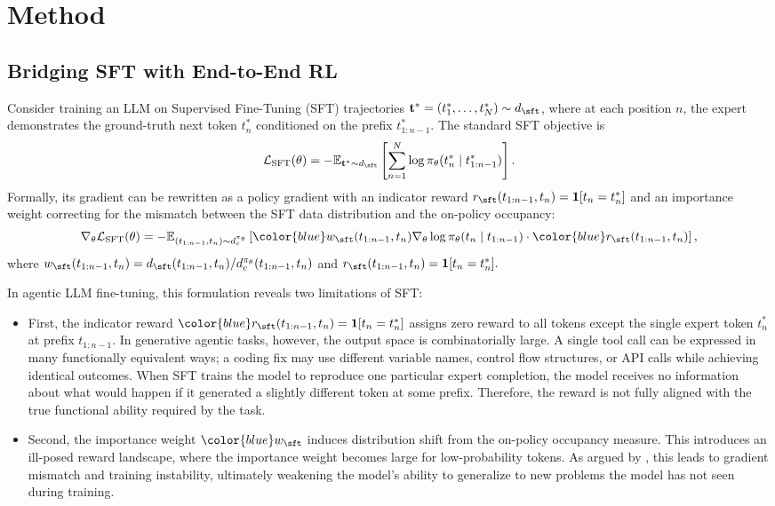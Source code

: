 \section{Method}
\label{sec:method}

\subsection{Bridging SFT with End-to-End RL}

Consider training an LLM on Supervised Fine-Tuning (SFT) trajectories $\mathbf{t}^* = (t_1^*, \dots, t_{N}^*) \sim d_{\sft}$, where at each position $n$, the expert demonstrates the ground-truth next token $t_n^*$ conditioned on the prefix $t_{1:n-1}^*$. The standard SFT objective is
\begin{align*}
\mathcal{L}_{\text{SFT}}(\theta)
= -\mathbb{E}_{\mathbf{t}^* \sim d_{\sft}}
\left[
\sum_{n=1}^{N}
\log \pi_\theta(t_n^* \mid t_{1:n-1}^*)
\right].
\end{align*}
Formally, its gradient can be rewritten as a policy gradient with an indicator reward
\(
r_{\sft}(t_{1:n-1}, t_n) = \mathbf{1}[t_n = t_n^*]
\)
and an importance weight correcting for the mismatch between the SFT data distribution and the on-policy occupancy:
\begin{align*}
\nabla_\theta \mathcal{L}_{\text{SFT}}(\theta)
= -\mathbb{E}_{(t_{1:n-1}, t_n) \sim d^{\pi_\theta}_c}
\left[
{\color{blue}w_{\sft}(t_{1:n-1}, t_n)}
\nabla_\theta \log \pi_\theta(t_n \mid t_{1:n-1})
\cdot
{\color{blue}r_{\sft}(t_{1:n-1}, t_n)}
\right],
\end{align*}
where
\(
w_{\sft}(t_{1:n-1}, t_n)
=
{d_{\sft}(t_{1:n-1}, t_n)}/{d^{\pi_\theta}_c(t_{1:n-1}, t_n)}
\)
and
\(
r_{\sft}(t_{1:n-1}, t_n)
=
\mathbf{1}[t_n = t_n^*].
\)

In agentic LLM fine-tuning, this formulation reveals two limitations of SFT:
\begin{itemize}
    \item First, the indicator reward ${\color{blue}r_{\sft}(t_{1:n-1}, t_n)} = \mathbf{1}[t_n = t_n^*]$ assigns zero reward to all tokens except the single expert token $t_n^*$ at prefix $t_{1:n-1}$. In generative agentic tasks, however, the output space is combinatorially large. A single tool call can be expressed in many functionally equivalent ways; a coding fix may use different variable names, control flow structures, or API calls while achieving identical outcomes. When SFT trains the model to reproduce one particular expert completion, the model receives no information about what would happen if it generated a slightly different token at some prefix. Therefore, the reward is not fully aligned with the true functional ability required by the task.
    \item Second, the importance weight ${\color{blue}w_{\sft}}$ induces distribution shift from the on-policy occupancy measure. This introduces an ill-posed reward landscape, where the importance weight becomes large for low-probability tokens. As argued by \citet{wu2025generalization}, this leads to gradient mismatch and training instability, ultimately weakening the model’s ability to generalize to new problems the model has not seen during training.
\end{itemize}

